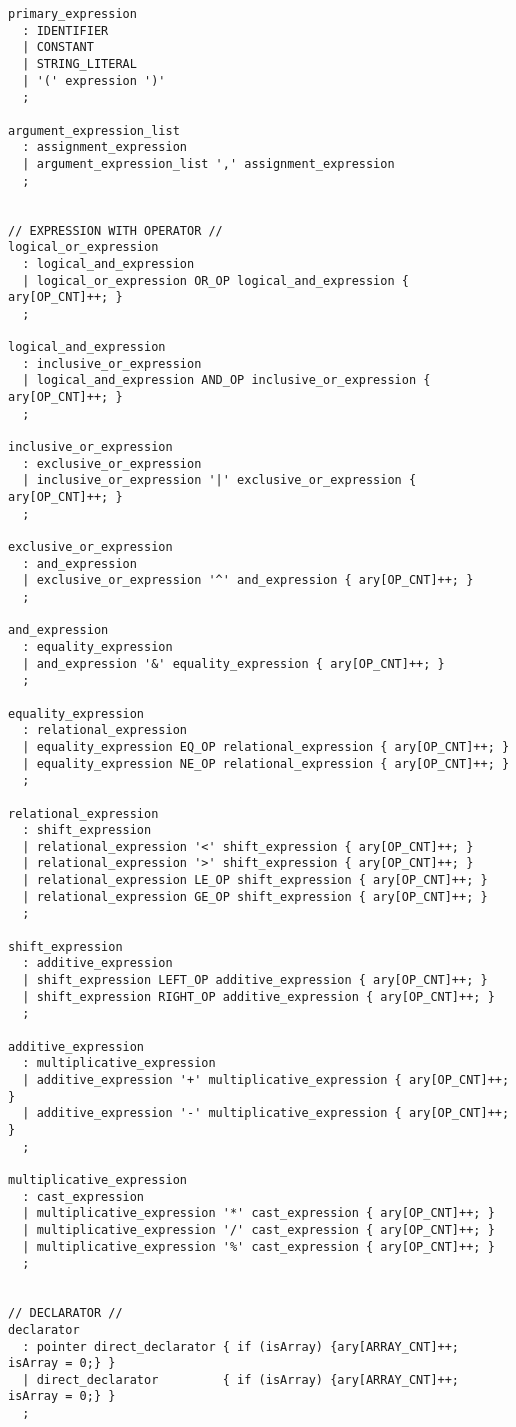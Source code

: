 \documentclass{article}
\begin{document}
\begin{verbatim}
primary_expression
  : IDENTIFIER
  | CONSTANT
  | STRING_LITERAL
  | '(' expression ')'
  ;

argument_expression_list
  : assignment_expression
  | argument_expression_list ',' assignment_expression
  ;


// EXPRESSION WITH OPERATOR //
logical_or_expression
  : logical_and_expression
  | logical_or_expression OR_OP logical_and_expression { ary[OP_CNT]++; }
  ;

logical_and_expression
  : inclusive_or_expression
  | logical_and_expression AND_OP inclusive_or_expression { ary[OP_CNT]++; }
  ;

inclusive_or_expression
  : exclusive_or_expression
  | inclusive_or_expression '|' exclusive_or_expression { ary[OP_CNT]++; }
  ;

exclusive_or_expression
  : and_expression
  | exclusive_or_expression '^' and_expression { ary[OP_CNT]++; }
  ;

and_expression
  : equality_expression 
  | and_expression '&' equality_expression { ary[OP_CNT]++; }
  ;

equality_expression
  : relational_expression
  | equality_expression EQ_OP relational_expression { ary[OP_CNT]++; }
  | equality_expression NE_OP relational_expression { ary[OP_CNT]++; }
  ;

relational_expression
  : shift_expression
  | relational_expression '<' shift_expression { ary[OP_CNT]++; }
  | relational_expression '>' shift_expression { ary[OP_CNT]++; }
  | relational_expression LE_OP shift_expression { ary[OP_CNT]++; }
  | relational_expression GE_OP shift_expression { ary[OP_CNT]++; }
  ;

shift_expression
  : additive_expression
  | shift_expression LEFT_OP additive_expression { ary[OP_CNT]++; }
  | shift_expression RIGHT_OP additive_expression { ary[OP_CNT]++; }
  ;

additive_expression
  : multiplicative_expression
  | additive_expression '+' multiplicative_expression { ary[OP_CNT]++; }
  | additive_expression '-' multiplicative_expression { ary[OP_CNT]++; }
  ;

multiplicative_expression
  : cast_expression
  | multiplicative_expression '*' cast_expression { ary[OP_CNT]++; }
  | multiplicative_expression '/' cast_expression { ary[OP_CNT]++; }
  | multiplicative_expression '%' cast_expression { ary[OP_CNT]++; }
  ;


// DECLARATOR //
declarator
  : pointer direct_declarator { if (isArray) {ary[ARRAY_CNT]++; isArray = 0;} }
  | direct_declarator         { if (isArray) {ary[ARRAY_CNT]++; isArray = 0;} }
  ;


\end{verbatim}
\end{document}
